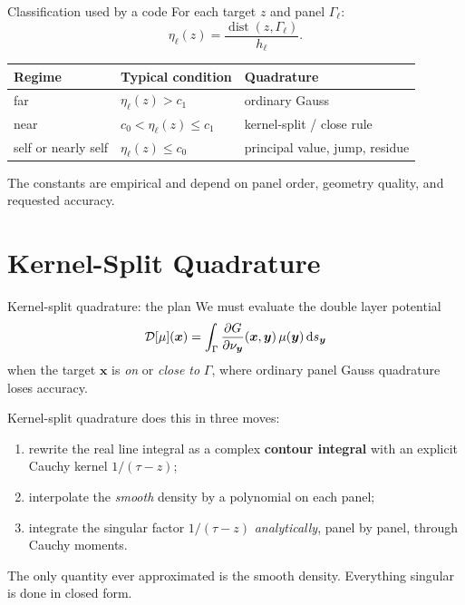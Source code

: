 \documentclass[aspectratio=169,11pt]{beamer}
\newcommand{\dd}{\,\mathrm d}
\newcommand{\x}{\bm{x}}
\newcommand{\y}{\bm{y}}
\newcommand{\hl}[1]{{\color{CCMorange}\textbf{#1}}}
\DeclareMathOperator{\dist}{dist}
\begin{document}
\begin{frame}{Classification used by a code}
\small
For each target $z$ and panel $\Gamma_\ell$:
\[
  \eta_\ell(z)=\frac{\dist(z,\Gamma_\ell)}{h_\ell}.
\]

\begin{tabular}{@{}lll@{}}
\toprule
Regime & Typical condition & Quadrature \\
\midrule
far & $\eta_\ell(z)>c_1$ & ordinary Gauss \\
near & $c_0<\eta_\ell(z)\le c_1$ & kernel-split / close rule \\
self or nearly self & $\eta_\ell(z)\le c_0$ & principal value, jump, residue \\
\bottomrule
\end{tabular}

\vspace{3mm}
The constants are empirical and depend on panel order, geometry quality, and requested accuracy.
\end{frame}


\section{Kernel-Split Quadrature}

\begin{frame}{Kernel-split quadrature: the plan}
\small
We must evaluate the double layer potential
\[
  \Dop[\mu](\x)=\int_\Gamma\frac{\partial G}{\partial\nu_{\y}}(\x,\y)\,\mu(\y)\dd s_{\y}
\]
when the target $\x$ is \emph{on} or \emph{close to} $\Gamma$, where ordinary
panel Gauss quadrature loses accuracy.

\vspace{1mm}
Kernel-split quadrature does this in three moves:
\begin{enumerate}
  \item rewrite the real line integral as a complex \hl{contour integral} with
  an explicit Cauchy kernel $1/(\tau-z)$;
  \item interpolate the \emph{smooth} density by a polynomial on each panel;
  \item integrate the singular factor $1/(\tau-z)$ \emph{analytically}, panel by
  panel, through Cauchy moments.
\end{enumerate}

\vspace{1mm}
The only quantity ever approximated is the smooth density.  Everything singular
is done in closed form.
\end{frame}
\end{document}
